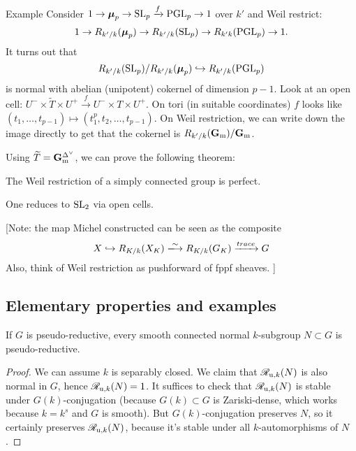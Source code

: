 \begin{enonce}[remark]{Example}
Consider 
$1 \to \boldsymbol\mu_p \to \operatorname{SL}_p \xrightarrow f \operatorname{PGL}_p \to 1$ 
over $k'$ and Weil restrict: 
\[
  1 \to R_{k'/k}(\boldsymbol\mu_p) \to R_{k'/k}(\operatorname{SL}_p) \to R_{k'k}(\operatorname{PGL}_p) \to 1. 
\]
It turns out that 
\[
  R_{k'/k}(\operatorname{SL}_p)/R_{k'/k}(\boldsymbol\mu_p) \hookrightarrow R_{k'/k}(\operatorname{PGL}_p) 
\]
is normal with abelian (unipotent) cokernel of dimension $p-1$. Look at an open 
cell: $U^-\times \widetilde T\times U^+ \xrightarrow f U^- \times T \times U^+$. 
On tori (in suitable coordinates) $f$ looks like $(t_1,\dots,t_{p-1})\mapsto (t_1^p,t_2,\dots,t_{p-1})$. 
On Weil restriction, we can write down the image directly to get that the cokernel 
is $R_{k'/k} (\mathbf{G}_{\mathrm{m}})/\mathbf{G}_{\mathrm{m}}$. 
\end{enonce}

Using $\widetilde T=\mathbf{G}_{\mathrm{m}}^{\Delta^\vee}$, we can prove the following theorem: 

\begin{theo}
The Weil restriction of a simply connected group is perfect. 
\end{theo}

One reduces to $\operatorname{SL}_2$ via open cells. 

[Note: the map Michel constructed can be seen as the composite 
\[
  X \hookrightarrow R_{K/k}(X_K) \isomorphism R_{K/k}(G_K) \xrightarrow{trace} G
\]
Also, think of Weil restriction as pushforward of fppf sheaves. 
]





\subsection{Elementary properties and examples}

\begin{lemm}
If $G$ is pseudo-reductive, every smooth connected normal $k$-subgroup 
$N\subset G$ is pseudo-reductive. 
\end{lemm}
\begin{proof}
We can assume $k$ is separably closed. We claim that $\mathscr{R}_{\mathrm{u},k}(N)$ is also normal 
in $G$, hence $\mathscr{R}_{\mathrm{u},k}(N)=1$. It suffices to check that $\mathscr{R}_{\mathrm{u},k}(N)$ is 
stable under $G(k)$-conjugation (because $G(k)\subset G$ is Zariski-dense, which 
works because $k=k^s$ and $G$ is smooth). But $G(k)$-conjugation preserves $N$, 
so it certainly preserves $\mathscr{R}_{\mathrm{u},k}(N)$, because it's stable under all 
$k$-automorphisms of $N$. 
\end{proof}


